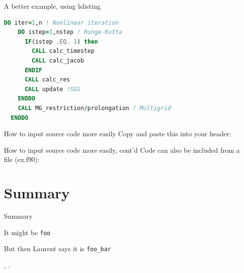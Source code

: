 \begin{frame}[fragile]{A better example, using lslisting}
\begin{lstlisting}[gobble=2, language=Fortran]
  DO iter=1,n ! Nonlinear iteration
    DO istep=1,nstep ! Runge-Kutta
      IF(istep .EQ. 1) then
        CALL calc_timestep
        CALL calc_jacob
      ENDIF
      CALL calc_res
      CALL update !SGS
    ENDDO
    CALL MG_restriction/prolongation ! Multigrid
  ENDDO
\end{lstlisting}



\end{frame}

\begin{frame}[fragile]{How to input source code more easily}
Copy and paste this into your header:

\end{frame}
\begin{frame}[fragile]{How to input source code more easily, cont'd}
Code can also be included from a file (ex.f90):

\end{frame}



\section{Summary}

\begin{frame}{Summary}

 
  It might be {\tt foo}

  \vfill
  But then Laurent says it is {\tt foo\_bar}

  \vfill
  , 
  .
\end{frame}

